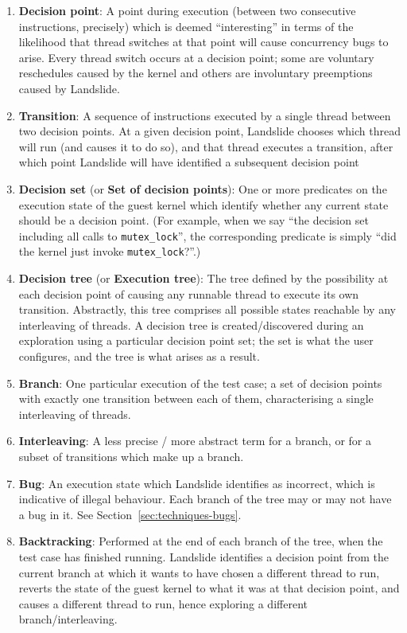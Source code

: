 \begin{enumerate}
	\item {\bf Decision point}:
		A point during execution (between two consecutive instructions, precisely) which is deemed ``interesting'' in terms of the likelihood that thread switches at that point will cause concurrency bugs to arise. Every thread switch occurs at a decision point; some are voluntary reschedules caused by the kernel and others are involuntary preemptions caused by Landslide.
	\item {\bf Transition}:
		A sequence of instructions executed by a single thread between two decision points. At a given decision point, Landslide chooses which thread will run (and causes it to do so), and that thread executes a transition, after which point Landslide will have identified a subsequent decision point
	\item {\bf Decision set} (or {\bf Set of decision points}):
		One or more predicates on the execution state of the guest kernel which identify whether any current state should be a decision point. (For example, when we say ``the decision set including all calls to \texttt{mutex\_lock}'', the corresponding predicate is simply ``did the kernel just invoke \texttt{mutex\_lock}?''.)
	\item {\bf Decision tree} (or {\bf Execution tree}):
		The tree defined by the possibility at each decision point of causing any runnable thread to execute its own transition. Abstractly, this tree comprises all possible states reachable by any interleaving of threads.
		A decision tree is created/discovered during an exploration using a particular decision point set; the set is what the user configures, and the tree is what arises as a result.
	\item {\bf Branch}:
		One particular execution of the test case; a set of decision points with exactly one transition between each of them, characterising a single interleaving of threads.
	\item {\bf Interleaving}:
		A less precise / more abstract term for a branch, or for a subset of transitions which make up a branch.
	\item {\bf Bug}: An execution state which Landslide identifies as incorrect, which is indicative of illegal behaviour. Each branch of the tree may or may not have a bug in it. See Section~\ref{sec:techniques-bugs}.
	\item {\bf Backtracking}:
		Performed at the end of each branch of the tree, when the test case has finished running. Landslide identifies a decision point from the current branch at which it wants to have chosen a different thread to run, reverts the state of the guest kernel to what it was at that decision point, and causes a different thread to run, hence exploring a different branch/interleaving.

\end{enumerate}
